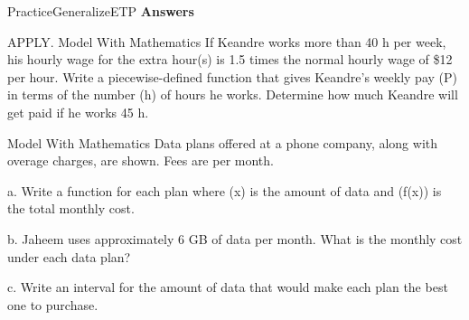 \documentclass{article}
\newenvironment{practice}[2]{}{}        %
\newenvironment{te-addendum}[2]{}{}     %
\newcommand{\answer}[1]{}               %
\newcommand{\placeholder}[2]{}          %
\newcommand{\te}[1]{}                   %
\begin{document}
\begin{te-addendum}{Practice}{GeneralizeETP}
\textbf{Answers}
\te{The answers printed here for Exercises 16--21 are attached to those practice blocks above. Practice \& Problem Solving is available at SavvasRealize.com.}
\end{te-addendum}
\begin{practice}{22}{2}
APPLY. Model With Mathematics If Keandre works more than 40 h per week, his hourly wage for the extra hour(s) is 1.5 times the normal hourly wage of \$12 per hour. Write a piecewise-defined function that gives Keandre's weekly pay (P) in terms of the number (h) of hours he works. Determine how much Keandre will get paid if he works 45 h.
\answer{Sample answer: (P(h)=\begin{cases}12h,&0<h\leq40\\18h-240,&40<h\end{cases}); \$570.}
\end{practice}
\begin{practice}{23}{2}
Model With Mathematics Data plans offered at a phone company, along with overage charges, are shown. Fees are per month.
\placeholder{illustration}{Four phone-shaped data-plan cards. BASIC Data Plan: 15 dollars for 2 GB, then 15 dollars for each additional GB. GOOD Data Plan: 25 dollars for 4 GB, then 20 dollars for each additional GB. BETTER Data Plan: 40 dollars for 5 GB, then 25 dollars for each additional GB. UNLIMITED Data Plan: 80 dollars.}
a. Write a function for each plan where (x) is the amount of data and (f(x)) is the total monthly cost.
\answer{a. Basic Data Plan (f(x)=\begin{cases}15,&x\leq2\\15+15(x-2),&x>2\end{cases}). Good Data Plan (f(x)=\begin{cases}25,&x\leq4\\25+20(x-4),&x>4\end{cases}). Better Data Plan (f(x)=\begin{cases}40,&x\leq5\\40+25(x-5),&x>5\end{cases}). Unlimited Data Plan (f(x)=80).}
b. Jaheem uses approximately 6 GB of data per month. What is the monthly cost under each data plan?
\answer{b. Basic (f(6)=\$75); Good (f(6)=\$65); Better (f(6)=\$65); Unlimited (f(6)=\$80).}
c. Write an interval for the amount of data that would make each plan the best one to purchase.
\answer{c. Basic ([0,2]); Good ((2,4]); Better ((4,6]); Unlimited ((6,\infty)).}
\te{Printed best-plan intervals do not match all cost crossover points of the printed functions; retained without silently replacing them.}
\end{practice}
\end{document}
